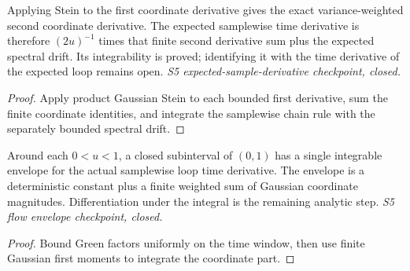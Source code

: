 \begin{lemma}
  \label{lem:loop-flow-stein-expectation}
  \leanok
  Applying Stein to the first coordinate derivative gives the exact
  variance-weighted second coordinate derivative. The expected samplewise
  time derivative is therefore $(2u)^{-1}$ times that finite second
  derivative sum plus the expected spectral drift. Its integrability is
  proved; identifying it with the time derivative of the expected loop
  remains open. \emph{S5 expected-sample-derivative checkpoint, closed.}
\end{lemma}
\begin{proof}\leanok
  Apply product Gaussian Stein to each bounded first derivative, sum the
  finite coordinate identities, and integrate the samplewise chain rule
  with the separately bounded spectral drift.
\end{proof}

\begin{lemma}
  \label{lem:loop-flow-derivative-envelope}
  \leanok
  Around each $0<u<1$, a closed subinterval of $(0,1)$ has a single
  integrable envelope for the actual samplewise loop time derivative. The
  envelope is a deterministic constant plus a finite weighted sum of
  Gaussian coordinate magnitudes. Differentiation under the integral is
  the remaining analytic step. \emph{S5 flow envelope checkpoint, closed.}
\end{lemma}
\begin{proof}\leanok
  Bound Green factors uniformly on the time window, then use finite
  Gaussian first moments to integrate the coordinate part.
\end{proof}

